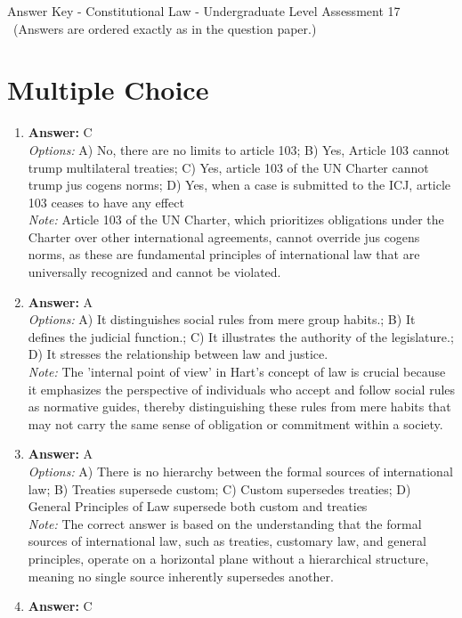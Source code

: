 \documentclass[12pt]{article}
\begin{document}
\begin{center}
Answer Key - Constitutional Law - Undergraduate Level Assessment 17 \
\small (Answers are ordered exactly as in the question paper.)
\end{center}

\section*{Multiple Choice}
\begin{enumerate}[label=\arabic*.]
\item \textbf{Answer:} C
\\ \textit{Options:} A) No, there are no limits to article 103; B) Yes, Article 103 cannot trump multilateral treaties; C) Yes, article 103 of the UN Charter cannot trump jus cogens norms; D) Yes, when a case is submitted to the ICJ, article 103 ceases to have any effect
\\ \textit{Note:} Article 103 of the UN Charter, which prioritizes obligations under the Charter over other international agreements, cannot override jus cogens norms, as these are fundamental principles of international law that are universally recognized and cannot be violated.
\item \textbf{Answer:} A
\\ \textit{Options:} A) It distinguishes social rules from mere group habits.; B) It defines the judicial function.; C) It illustrates the authority of the legislature.; D) It stresses the relationship between law and justice.
\\ \textit{Note:} The 'internal point of view' in Hart's concept of law is crucial because it emphasizes the perspective of individuals who accept and follow social rules as normative guides, thereby distinguishing these rules from mere habits that may not carry the same sense of obligation or commitment within a society.
\item \textbf{Answer:} A
\\ \textit{Options:} A) There is no hierarchy between the formal sources of international law; B) Treaties supersede custom; C) Custom supersedes treaties; D) General Principles of Law supersede both custom and treaties
\\ \textit{Note:} The correct answer is based on the understanding that the formal sources of international law, such as treaties, customary law, and general principles, operate on a horizontal plane without a hierarchical structure, meaning no single source inherently supersedes another.
\item \textbf{Answer:} C

\end{enumerate}
\end{document}
